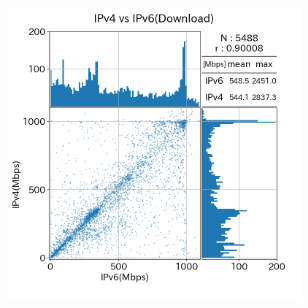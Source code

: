 \begin{figure}[htbp]
\begin{center}
\begin{minipage}[t]{0.48\textwidth}
\begin{center}
\begin{subfigure}[b]{\textwidth}
                    \label{new_KDDI_dl}
                \end{subfigure}
                \begin{subfigure}[b]{\textwidth}
                    \centering
                    \includegraphics[width=0.85\textwidth]{fig/new_Sony_dl.png}
                    \label{new_Sony_dl}
                \end{subfigure}
                \caption{ISPの違いによる\\ダウンロードのスループット}
                \label{fig:new_isp_dl2}
            \end{center}
        \end{minipage}
        \hfill
        \begin{minipage}[t]{0.48\textwidth}
            \begin{center}
                \begin{subfigure}[b]{\textwidth}
                    \centering

\end{subfigure}
\end{center}
\end{minipage}
\end{center}
\end{figure}
